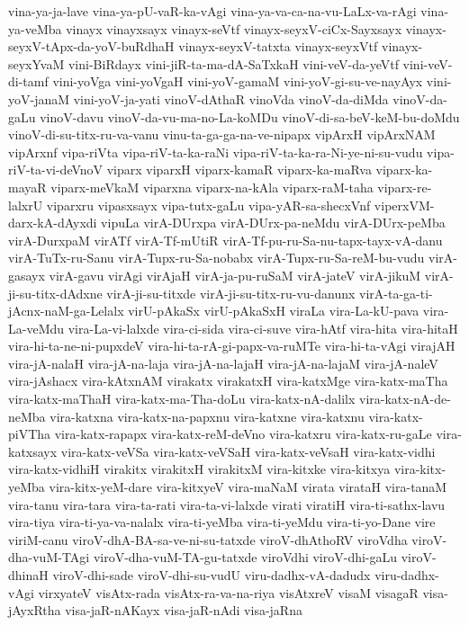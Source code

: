 {vina-ya-ja-lave
vina-ya-pU-vaR-ka-vAgi
vina-ya-va-ca-na-vu-LaLx-va-rAgi
vina-ya-veMba
vinayx
vinayxsayx
vinayx-seVtf
vinayx-seyxV-ciCx-Sayxsayx
vinayx-seyxV-tApx-da-yoV-buRdhaH
vinayx-seyxV-tatxta
vinayx-seyxVtf
vinayx-seyxYvaM
vini-BiRdayx
vini-jiR-ta-ma-dA-SaTxkaH
vini-veV-da-yeVtf
vini-veV-di-tamf
vini-yoVga
vini-yoVgaH
vini-yoV-gamaM
vini-yoV-gi-su-ve-nayAyx
vini-yoV-janaM
vini-yoV-ja-yati
vinoV-dAthaR
vinoVda
vinoV-da-diMda
vinoV-da-gaLu
vinoV-davu
vinoV-da-vu-ma-no-La-koMDu
vinoV-di-sa-beV-keM-bu-doMdu
vinoV-di-su-titx-ru-va-vanu
vinu-ta-ga-ga-na-ve-nipapx
vipArxH
vipArxNAM
vipArxnf
vipa-riVta
vipa-riV-ta-ka-raNi
vipa-riV-ta-ka-ra-Ni-ye-ni-su-vudu
vipa-riV-ta-vi-deVnoV
viparx
viparxH
viparx-kamaR
viparx-ka-maRva
viparx-ka-mayaR
viparx-meVkaM
viparxna
viparx-na-kAla
viparx-raM-taha
viparx-re-lalxrU
viparxru
vipasxsayx
vipa-tutx-gaLu
vipa-yAR-sa-shecxVnf
viperxVM-darx-kA-dAyxdi
vipuLa
virA-DUrxpa
virA-DUrx-pa-neMdu
virA-DUrx-peMba
virA-DurxpaM
virATf
virA-Tf-mUtiR
virA-Tf-pu-ru-Sa-nu-tapx-tayx-vA-danu
virA-TuTx-ru-Sanu
virA-Tupx-ru-Sa-nobabx
virA-Tupx-ru-Sa-reM-bu-vudu
virA-gasayx
virA-gavu
virAgi
virAjaH
virA-ja-pu-ruSaM
virA-jateV
virA-jikuM
virA-ji-su-titx-dAdxne
virA-ji-su-titxde
virA-ji-su-titx-ru-vu-danunx
virA-ta-ga-ti-jAcnx-naM-ga-Lelalx
virU-pAkaSx
virU-pAkaSxH
viraLa
vira-La-kU-pava
vira-La-veMdu
vira-La-vi-lalxde
vira-ci-sida
vira-ci-suve
vira-hAtf
vira-hita
vira-hitaH
vira-hi-ta-ne-ni-pupxdeV
vira-hi-ta-rA-gi-papx-va-ruMTe
vira-hi-ta-vAgi
virajAH
vira-jA-nalaH
vira-jA-na-laja
vira-jA-na-lajaH
vira-jA-na-lajaM
vira-jA-naleV
vira-jAshacx
vira-kAtxnAM
virakatx
virakatxH
vira-katxMge
vira-katx-maTha
vira-katx-maThaH
vira-katx-ma-Tha-doLu
vira-katx-nA-dalilx
vira-katx-nA-de-neMba
vira-katxna
vira-katx-na-papxnu
vira-katxne
vira-katxnu
vira-katx-piVTha
vira-katx-rapapx
vira-katx-reM-deVno
vira-katxru
vira-katx-ru-gaLe
vira-katxsayx
vira-katx-veVSa
vira-katx-veVSaH
vira-katx-veVsaH
vira-katx-vidhi
vira-katx-vidhiH
virakitx
virakitxH
virakitxM
vira-kitxke
vira-kitxya
vira-kitx-yeMba
vira-kitx-yeM-dare
vira-kitxyeV
vira-maNaM
virata
virataH
vira-tanaM
vira-tanu
vira-tara
vira-ta-rati
vira-ta-vi-lalxde
virati
viratiH
vira-ti-sathx-lavu
vira-tiya
vira-ti-ya-va-nalalx
vira-ti-yeMba
vira-ti-yeMdu
vira-ti-yo-Dane
vire
viriM-canu
viroV-dhA-BA-sa-ve-ni-su-tatxde
viroV-dhAthoRV
viroVdha
viroV-dha-vuM-TAgi
viroV-dha-vuM-TA-gu-tatxde
viroVdhi
viroV-dhi-gaLu
viroV-dhinaH
viroV-dhi-sade
viroV-dhi-su-vudU
viru-dadhx-vA-dadudx
viru-dadhx-vAgi
virxyateV
visAtx-rada
visAtx-ra-va-na-riya
visAtxreV
visaM
visagaR
visa-jAyxRtha
visa-jaR-nAKayx
visa-jaR-nAdi
visa-jaRna
}
